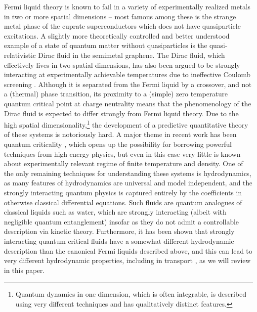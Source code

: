 Fermi liquid theory is known to fail in a variety of experimentally realized metals in two or more spatial dimensions -- most famous among these is the strange metal phase of the cuprate superconductors \cite{marel_quantum_2003, cooper_anomalous_2009, keimer_quantum_2011} which does not have quasiparticle excitations.  A slightly more theoretically controlled  and better understood example  of a state of quantum matter without quasiparticles is the quasi-relativistic Dirac fluid in the semimetal graphene.   The Dirac fluid, which effectively lives in two spatial dimensions, has also been argued to be strongly interacting at experimentally achievable temperatures \cite{sheehy_quantum_2007, muller_collective_2008, fritz_quantum_2008, li_scanning_2009} due to ineffective Coulomb screening \cite{siegel_charge-carrier_2013}.    Although it is separated from the Fermi liquid by a crossover, and not a (thermal) phase transition, its proximity to a (simple) zero temperature quantum critical point at charge neutrality means that the phenomenology of the Dirac fluid is expected to differ strongly from Fermi liquid theory.   Due to the high spatial dimensionality,\footnote{Quantum dynamics in one dimension,  which is often integrable, is described using very different techniques and has qualitatively distinct features.} the development of a predictive quantitative theory of these systems is notoriously hard.   A major theme in recent work has been quantum criticality \cite{damle_nonzero-temperature_1997, sachdev_quantum_2011}, which opens up the possibility for borrowing powerful techniques from high energy physics,  but even in this case very little is known about experimentally relevant regime of finite temperature and density.    One of the only remaining techniques for understanding these systems is hydrodynamics, as many features of hydrodynamics are universal and model independent, and the strongly interacting quantum physics is captured entirely by the coefficients in otherwise classical differential equations.  Such fluids are quantum analogues of classical liquids such as water, which are strongly interacting (albeit with negligible quantum entanglement) insofar as they do not admit a controllable description via kinetic theory.   Furthermore, it has been shown \cite{hartnoll_theory_2007} that strongly interacting quantum critical fluids have a somewhat different hydrodynamic description than the canonical Fermi liquids described above, and this can lead to very different hydrodynamic properties,  including in transport \cite{hartnoll_theory_2007, muller_collective_2008, fritz_quantum_2008, muller_quantum-critical_2008, muller_graphene:_2009, foster_slow_2009, davison_holographic_2014}, as we will review in this paper.

